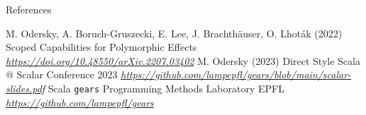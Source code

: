 \documentclass[aspectratio=1610,xcolor=dvipsnames]{beamer}
\begin{document}
\begin{frame}{References}
  \footnotesize{
      \begin{thebibliography}{99}
           M. Odersky, A. Boruch-Gruszecki, E. Lee, J. Brachthäuser, O. Lhoták (2022)
          \newblock Scoped Capabilities for Polymorphic Effects
          \newblock \emph{\href{https://doi.org/10.48550/arXiv.2207.03402}{https://doi.org/10.48550/arXiv.2207.03402}}
           M. Odersky (2023)
          \newblock Direct Style Scala @ Scalar Conference 2023 
          \newblock \emph{\href{https://github.com/lampepfl/gears/blob/main/scalar-slides.pdf}{https://github.com/lampepfl/gears/blob/main/scalar-slides.pdf}}
           Scala \texttt{gears}
          \newblock Programming Methods Laboratory EPFL
          \newblock \emph{\href{https://github.com/lampepfl/gears}{https://github.com/lampepfl/gears}}
      \end{thebibliography}
  }
\end{frame}
\end{document}
